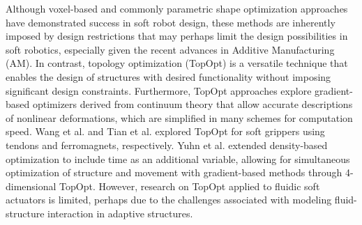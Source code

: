 Although voxel-based \cite{Kriegman2019,Cheney2013} and commonly parametric shape optimization \cite{Coevoet2017,Manns2018Jan,Morzadec2019Apr} approaches have demonstrated success in soft robot design, these methods are inherently imposed by design restrictions that may perhaps limit the design possibilities in soft robotics, especially given the recent advances in Additive Manufacturing (AM). In contrast, topology optimization \cite{Bendsoe2003,Gain2013Dec,Zhang2017Topo,Talischi2012Mar,Vasista2013Jul} (TopOpt) is a versatile technique that enables the design of structures with desired functionality without imposing significant design constraints. Furthermore, TopOpt approaches explore gradient-based optimizers derived from continuum theory that allow accurate descriptions of nonlinear deformations, which are simplified in many schemes for computation speed. Wang et al. \cite{Wang2020Nov} and Tian et al. \cite{Tian2020May} explored TopOpt for soft grippers using tendons and ferromagnets, respectively. Yuhn et al. \cite{Yuhn2023Feb} extended density-based optimization to include time as an additional variable, allowing for simultaneous optimization of structure and movement with gradient-based methods through 4-dimensional TopOpt. However, research on TopOpt applied to fluidic soft actuators is limited, perhaps due to the challenges associated with modeling fluid-structure interaction in adaptive structures.

\vspace{-2mm}
